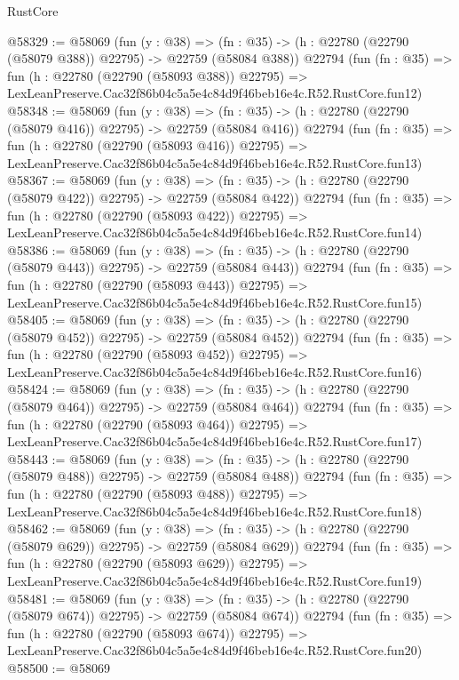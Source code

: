 \begin{lexlean}{RustCore}
\begin{coremodule}
@58329 := @58069
    (fun (y : @38) =>
    (fn : @35) -> (h : @22780 (@22790 (@58079 @388)) @22795) -> @22759 (@58084 @388))
    @22794
    (fun (fn : @35) =>
    fun (h : @22780 (@22790 (@58093 @388)) @22795) =>
    LexLeanPreserve.Cac32f86b04c5a5e4c84d9f46beb16e4c.R52.RustCore.fun12)
@58348 := @58069
    (fun (y : @38) =>
    (fn : @35) -> (h : @22780 (@22790 (@58079 @416)) @22795) -> @22759 (@58084 @416))
    @22794
    (fun (fn : @35) =>
    fun (h : @22780 (@22790 (@58093 @416)) @22795) =>
    LexLeanPreserve.Cac32f86b04c5a5e4c84d9f46beb16e4c.R52.RustCore.fun13)
@58367 := @58069
    (fun (y : @38) =>
    (fn : @35) -> (h : @22780 (@22790 (@58079 @422)) @22795) -> @22759 (@58084 @422))
    @22794
    (fun (fn : @35) =>
    fun (h : @22780 (@22790 (@58093 @422)) @22795) =>
    LexLeanPreserve.Cac32f86b04c5a5e4c84d9f46beb16e4c.R52.RustCore.fun14)
@58386 := @58069
    (fun (y : @38) =>
    (fn : @35) -> (h : @22780 (@22790 (@58079 @443)) @22795) -> @22759 (@58084 @443))
    @22794
    (fun (fn : @35) =>
    fun (h : @22780 (@22790 (@58093 @443)) @22795) =>
    LexLeanPreserve.Cac32f86b04c5a5e4c84d9f46beb16e4c.R52.RustCore.fun15)
@58405 := @58069
    (fun (y : @38) =>
    (fn : @35) -> (h : @22780 (@22790 (@58079 @452)) @22795) -> @22759 (@58084 @452))
    @22794
    (fun (fn : @35) =>
    fun (h : @22780 (@22790 (@58093 @452)) @22795) =>
    LexLeanPreserve.Cac32f86b04c5a5e4c84d9f46beb16e4c.R52.RustCore.fun16)
@58424 := @58069
    (fun (y : @38) =>
    (fn : @35) -> (h : @22780 (@22790 (@58079 @464)) @22795) -> @22759 (@58084 @464))
    @22794
    (fun (fn : @35) =>
    fun (h : @22780 (@22790 (@58093 @464)) @22795) =>
    LexLeanPreserve.Cac32f86b04c5a5e4c84d9f46beb16e4c.R52.RustCore.fun17)
@58443 := @58069
    (fun (y : @38) =>
    (fn : @35) -> (h : @22780 (@22790 (@58079 @488)) @22795) -> @22759 (@58084 @488))
    @22794
    (fun (fn : @35) =>
    fun (h : @22780 (@22790 (@58093 @488)) @22795) =>
    LexLeanPreserve.Cac32f86b04c5a5e4c84d9f46beb16e4c.R52.RustCore.fun18)
@58462 := @58069
    (fun (y : @38) =>
    (fn : @35) -> (h : @22780 (@22790 (@58079 @629)) @22795) -> @22759 (@58084 @629))
    @22794
    (fun (fn : @35) =>
    fun (h : @22780 (@22790 (@58093 @629)) @22795) =>
    LexLeanPreserve.Cac32f86b04c5a5e4c84d9f46beb16e4c.R52.RustCore.fun19)
@58481 := @58069
    (fun (y : @38) =>
    (fn : @35) -> (h : @22780 (@22790 (@58079 @674)) @22795) -> @22759 (@58084 @674))
    @22794
    (fun (fn : @35) =>
    fun (h : @22780 (@22790 (@58093 @674)) @22795) =>
    LexLeanPreserve.Cac32f86b04c5a5e4c84d9f46beb16e4c.R52.RustCore.fun20)
@58500 := @58069

\end{coremodule}
\end{lexlean}
